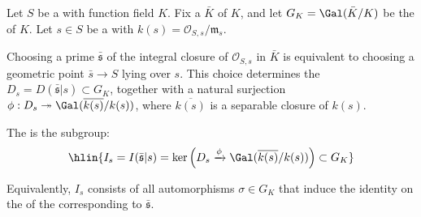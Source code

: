 \begin{definition} \label{definition:inertia_group_in_the_absolute_galois_group_of_the_function_field_of_a_dedekind_scheme_at_a_closed_point}
    Let $S$ be a  with function field $K$. Fix a  $\bar{K}$ of $K$, and let $G_K = \Gal(\bar{K}/K)$ be the  of $K$. Let $s \in S$ be a  with  $k(s) = \mathcal{O}_{S, s} / \mathfrak{m}_s$.

    Choosing a prime $\bar{\mathfrak{s}}$ of the integral closure of $\mathcal{O}_{S, s}$ in $\bar{K}$ is equivalent to choosing a geometric point $\bar{s} \to S$ lying over $s$. This choice determines the  $D_s = D(\bar{\mathfrak{s}} | s) \subset G_K$, together with a natural surjection $\phi: D_s \twoheadrightarrow \Gal(\overline{k(s)}/k(s))$, where $\overline{k(s)}$ is a separable closure of $k(s)$.

    The  is the subgroup:
    $$\hlin{I_s = I(\bar{\mathfrak{s}} | s) = \ker\left( D_s \xrightarrow{\phi} \Gal(\overline{k(s)}/k(s)) \right) \subset G_K}$$

    Equivalently, $I_s$ consists of all automorphisms $\sigma \in G_K$ that induce the identity on the  of the  corresponding to $\bar{\mathfrak{s}}$.
\end{definition}
